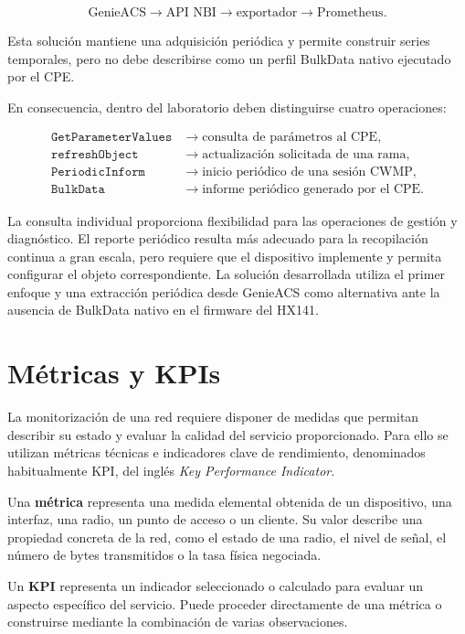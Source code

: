 \[
    \text{GenieACS}
    \longrightarrow
    \text{API NBI}
    \longrightarrow
    \text{exportador}
    \longrightarrow
    \text{Prometheus}.
\]

Esta solución mantiene una adquisición periódica y permite construir
series temporales, pero no debe describirse como un perfil BulkData
nativo ejecutado por el CPE.

En consecuencia, dentro del laboratorio deben distinguirse cuatro
operaciones:

\[
\begin{aligned}
    \texttt{GetParameterValues}
    &\longrightarrow
    \text{consulta de parámetros al CPE},\\
    \texttt{refreshObject}
    &\longrightarrow
    \text{actualización solicitada de una rama},\\
    \texttt{PeriodicInform}
    &\longrightarrow
    \text{inicio periódico de una sesión CWMP},\\
    \texttt{BulkData}
    &\longrightarrow
    \text{informe periódico generado por el CPE}.
\end{aligned}
\]

La consulta individual proporciona flexibilidad para las operaciones de
gestión y diagnóstico. El reporte periódico resulta más adecuado para la
recopilación continua a gran escala, pero requiere que el dispositivo
implemente y permita configurar el objeto correspondiente. La solución
desarrollada utiliza el primer enfoque y una extracción periódica desde
GenieACS como alternativa ante la ausencia de BulkData nativo en el
firmware del HX141.

\section{Métricas y KPIs}
\label{sec:metricas-kpis}

La monitorización de una red requiere disponer de medidas que permitan
describir su estado y evaluar la calidad del servicio proporcionado. Para
ello se utilizan métricas técnicas e indicadores clave de rendimiento,
denominados habitualmente KPI, del inglés
\textit{Key Performance Indicator}.

Una \textbf{métrica} representa una medida elemental obtenida de un
dispositivo, una interfaz, una radio, un punto de acceso o un cliente. Su
valor describe una propiedad concreta de la red, como el estado de una
radio, el nivel de señal, el número de bytes transmitidos o la tasa física
negociada.

Un \textbf{KPI} representa un indicador seleccionado o calculado para
evaluar un aspecto específico del servicio. Puede proceder directamente
de una métrica o construirse mediante la combinación de varias
observaciones.

